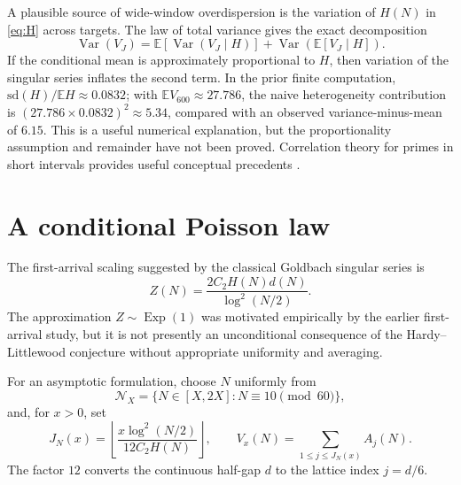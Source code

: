 \documentclass[11pt,a4paper]{article}
\theoremstyle{definition}
\newcommand{\E}{\mathbb E}
\begin{document}
A plausible source of wide-window overdispersion is the variation of $H(N)$ in \eqref{eq:H} across targets.  The law of total variance gives the exact decomposition
\begin{equation}\label{eq:totvar}
 \operatorname{Var}(V_J)=\E[\operatorname{Var}(V_J\mid H)]
 +\operatorname{Var}(\E[V_J\mid H]).
\end{equation}
If the conditional mean is approximately proportional to $H$, then variation of the singular series inflates the second term. In the prior finite computation, $\mathrm{sd}(H)/\E H\approx0.0832$; with $\E V_{600}\approx27.786$, the naive heterogeneity contribution is $(27.786\times0.0832)^2\approx5.34$, compared with an observed variance-minus-mean of $6.15$. This is a useful numerical explanation, but the proportionality assumption and remainder have not been proved.  Correlation theory for primes in short intervals provides useful conceptual precedents \cite{MontgomerySoundararajan2004}.

\section{A conditional Poisson law}
The first-arrival scaling suggested by the classical Goldbach singular series \cite{HardyLittlewood1923} is
\begin{equation}\label{eq:Z}
 Z(N)=\frac{2C_2H(N)d(N)}{\log^2(N/2)}.
\end{equation}
The approximation $Z\sim\operatorname{Exp}(1)$ was motivated empirically by the earlier first-arrival study, but it is not presently an unconditional consequence of the Hardy--Littlewood conjecture without appropriate uniformity and averaging.

For an asymptotic formulation, choose $N$ uniformly from
\[
 \mathcal N_X=\{N\in[X,2X]:N\equiv10\pmod{60}\},
\]
and, for $x>0$, set
\begin{equation}\label{eq:windowx}
 J_N(x)=\left\lfloor\frac{x\log^2(N/2)}{12C_2H(N)}\right\rfloor,
 \qquad V_x(N)=\sum_{1\le j\le J_N(x)}A_j(N).
\end{equation}
The factor $12$ converts the continuous half-gap $d$ to the lattice index $j=d/6$.
\end{document}
